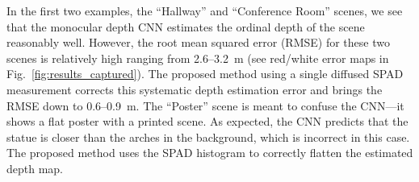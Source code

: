 In the first two examples, the ``Hallway'' and ``Conference Room'' scenes, we
see that the monocular depth CNN estimates the ordinal depth of the scene
reasonably well. However, the root mean squared error (RMSE) for these two
scenes is relatively high ranging from 2.6--3.2~m (see red/white error maps in
Fig.~\ref{fig:results_captured}). The proposed method using a single diffused
SPAD measurement corrects this systematic depth estimation error and brings the
RMSE down to 0.6--0.9~m. The ``Poster'' scene is meant to confuse the CNN---it
shows a flat poster with a printed scene. As expected, the CNN predicts that the
statue is closer than the arches in the background, which is incorrect in this
case. The proposed method uses the SPAD histogram to correctly flatten the
estimated depth map.

